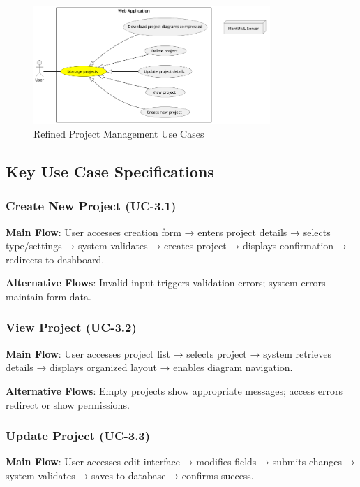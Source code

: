 \begin{figure}[H]
\centering
\includegraphics[width=0.8\textwidth]{conception/SprintIII/use_case_diagrams/refined_use_case_feature_project_management.png}
\caption{Refined Project Management Use Cases}
\label{fig:refined_use_case_project_mgmt}
\end{figure}

\subsection{Key Use Case Specifications}

\subsubsection{Create New Project (UC-3.1)}
\textbf{Main Flow}: User accesses creation form → enters project details → selects type/settings → system validates → creates project → displays confirmation → redirects to dashboard.

\textbf{Alternative Flows}: Invalid input triggers validation errors; system errors maintain form data.

\subsubsection{View Project (UC-3.2)}
\textbf{Main Flow}: User accesses project list → selects project → system retrieves details → displays organized layout → enables diagram navigation.

\textbf{Alternative Flows}: Empty projects show appropriate messages; access errors redirect or show permissions.

\subsubsection{Update Project (UC-3.3)}
\textbf{Main Flow}: User accesses edit interface → modifies fields → submits changes → system validates → saves to database → confirms success.

